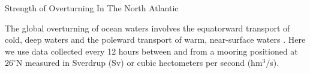 \vspace{-1.0cm}
\begin{center}
     \Large Strength of Overturning In The North Atlantic
\end{center}
The global overturning of ocean waters involves the equatorward transport of cold, deep waters and the poleward transport of warm, near-surface waters \cite{doi:10.1146/annurev-marine-120710-100740}. Here we use data collected every 12 hours between \DTMshowzonefalse{} and  from a mooring positioned at $26^\circ$N measured in Sverdrup (Sv) or cubic hectometers per second (hm$^3/$s).